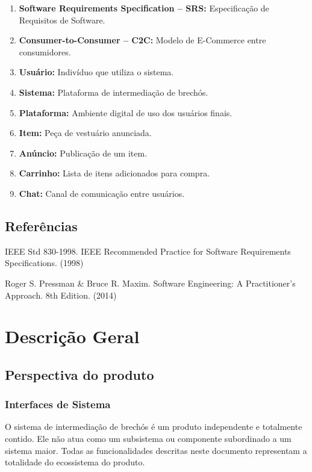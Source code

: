 ﻿\documentclass[12pt,a4paper]{article}
\begin{document}
\begin{enumerate}[label=\alph*)]
    \item \textbf{Software Requirements Specification – SRS:} Especificação de Requisitos de Software.
    \item \textbf{Consumer-to-Consumer – C2C:} Modelo de E-Commerce entre consumidores.
    \item \textbf{Usuário:} Indivíduo que utiliza o sistema.
    \item \textbf{Sistema:} Plataforma de intermediação de brechós.
    \item \textbf{Plataforma:} Ambiente digital de uso dos usuários finais.
    \item \textbf{Item:} Peça de vestuário anunciada.
    \item \textbf{Anúncio:} Publicação de um item.
    \item \textbf{Carrinho:} Lista de itens adicionados para compra.
    \item \textbf{Chat:} Canal de comunicação entre usuários.
\end{enumerate}

\subsection{Referências}
\label{sec:Referencias}

IEEE Std 830-1998. IEEE Recommended Practice for Software Requirements Specifications. (1998)

Roger S. Pressman \& Bruce R. Maxim. Software Engineering: A Practitioner's Approach. 8th Edition. (2014)


\section{Descrição Geral}
\label{sec:DescricaoGeral}

\subsection{Perspectiva do produto}
\label{sec:PerspectivaProduto}

\subsubsection{Interfaces de Sistema}
\label{sec:InterfaceSistema}

O sistema de intermediação de brechós é um produto independente e totalmente contido. Ele não atua como um subsistema ou componente subordinado a um sistema maior. Todas as funcionalidades descritas neste documento representam a totalidade do ecossistema do produto.
\end{document}
